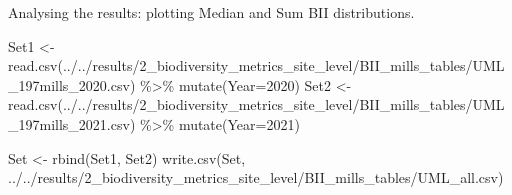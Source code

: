 \documentclass[
  letterpaper,
  DIV=11,
  numbers=noendperiod]{scrartcl}
\newenvironment{Shaded}{\begin{snugshade}}{\end{snugshade}}
\newcommand{\AttributeTok}[1]{\textcolor[rgb]{0.40,0.45,0.13}{#1}}
\newcommand{\DecValTok}[1]{\textcolor[rgb]{0.68,0.00,0.00}{#1}}
\newcommand{\FunctionTok}[1]{\textcolor[rgb]{0.28,0.35,0.67}{#1}}
\newcommand{\NormalTok}[1]{\textcolor[rgb]{0.00,0.23,0.31}{#1}}
\newcommand{\OtherTok}[1]{\textcolor[rgb]{0.00,0.23,0.31}{#1}}
\newcommand{\SpecialCharTok}[1]{\textcolor[rgb]{0.37,0.37,0.37}{#1}}
\newcommand{\StringTok}[1]{\textcolor[rgb]{0.13,0.47,0.30}{#1}}
\begin{document}
Analysing the results: plotting Median and Sum BII distributions.

\begin{Shaded}
\begin{Highlighting}[]
\NormalTok{Set1 }\OtherTok{\textless{}{-}} \FunctionTok{read.csv}\NormalTok{(}\StringTok{\textquotesingle{}../../results/2\_biodiversity\_metrics\_site\_level/BII\_mills\_tables/UML\_197mills\_2020.csv\textquotesingle{}}\NormalTok{) }\SpecialCharTok{\%\textgreater{}\%} 
  \FunctionTok{mutate}\NormalTok{(}\AttributeTok{Year=}\DecValTok{2020}\NormalTok{)}
\NormalTok{Set2 }\OtherTok{\textless{}{-}}  \FunctionTok{read.csv}\NormalTok{(}\StringTok{\textquotesingle{}../../results/2\_biodiversity\_metrics\_site\_level/BII\_mills\_tables/UML\_197mills\_2021.csv\textquotesingle{}}\NormalTok{) }\SpecialCharTok{\%\textgreater{}\%} 
  \FunctionTok{mutate}\NormalTok{(}\AttributeTok{Year=}\DecValTok{2021}\NormalTok{)}

\NormalTok{Set }\OtherTok{\textless{}{-}} \FunctionTok{rbind}\NormalTok{(Set1, Set2)}
\FunctionTok{write.csv}\NormalTok{(Set, }\StringTok{\textquotesingle{}../../results/2\_biodiversity\_metrics\_site\_level/BII\_mills\_tables/UML\_all.csv\textquotesingle{}}\NormalTok{)}
\end{Highlighting}
\end{Shaded}
\end{document}
